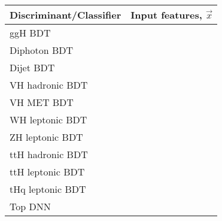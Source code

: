 \begin{tabular}{l|m{11cm}<{\centering}}
    \hline
    Discriminant/Classifier & Input features, $\vec{x}$ \\ \hline
    ggH BDT &  \\ \hline
    
    Diphoton BDT &  \\ \hline
    
    Dijet BDT &  \\ \hline
    
    VH hadronic BDT &  \\ \hline    
    
    VH MET BDT &  \\ \hline
    
    WH leptonic BDT &  \\ \hline
    
    ZH leptonic BDT &  \\ \hline

    ttH hadronic BDT &  \\ \hline
    
    ttH leptonic BDT &  \\ \hline
    
    tHq leptonic BDT &  \\ \hline
    
    Top DNN &  \\
    \hline
\end{tabular}